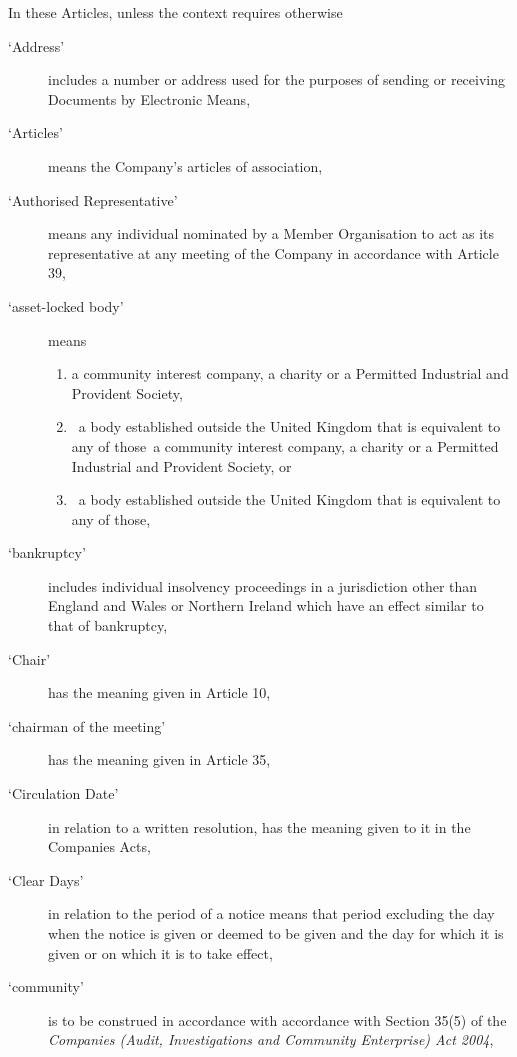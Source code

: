 \documentclass[a4paper,12pt]{article}
\renewcommand{\labelenumi}{\thesection.\arabic{enumi}}
\begin{document}
In these Articles, unless the context requires otherwise %

\begin{description}
  \item[`Address'] includes a number or address used for the purposes of sending or receiving Documents by Electronic Means,
  \item[`Articles'] means the Company's articles of association,
  \item[`Authorised Representative'] means any individual nominated by a Member Organisation to act as its representative at any meeting of the Company in accordance with Article 39,
  \item[`asset-locked body'] means
  \begin{enumerate}
    \renewcommand{\labelenumi}{(\alph{enumi})}
    \item a community interest company, a charity or a Permitted Industrial and Provident Society,
    \item a body established outside the United Kingdom that is equivalent to any of those a community interest company, a charity or a Permitted Industrial and Provident Society, or
    \item a body established outside the United Kingdom that is equivalent to any of those,
  \end{enumerate}
  \item[`bankruptcy'] includes individual insolvency proceedings in a jurisdiction other than England and Wales or Northern Ireland which have an effect similar to that of bankruptcy,
  \item[`Chair'] has the meaning given in Article 10,
  \item[`chairman of the meeting'] has the meaning given in Article 35,
  \item[`Circulation Date'] in relation to a written resolution, has the meaning given to it in the Companies Acts,
  \item[`Clear Days'] in relation to the period of a notice means that period excluding the day when the notice is given or deemed to be given and the day for which it is given or on which it is to take effect,
  \item[`community'] is to be construed in accordance with accordance with Section 35(5) of the \textit{Companies (Audit, Investigations and Community Enterprise) Act 2004}, %

\end{description}
\end{document}
